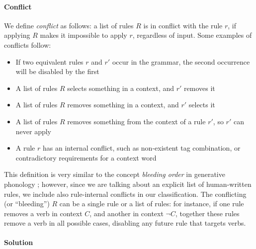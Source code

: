 \paragraph{Conflict}

We define \emph{conflict} as follows: a list of rules $R$ is in conflict with the rule $r$, if applying $R$ makes it impossible to apply $r$, regardless of input. 
Some examples of conflicts follow:

\begin{itemize}
\item If two equivalent rules $r$ and $r'$ occur in the grammar, the second occurrence will be disabled by the first
\item A list of rules $R$ selects something in a context, and $r'$ removes it
\item A list of rules $R$ removes something in a context, and $r'$ selects it
\item A list of rules $R$ removes something from the context of a rule $r'$, so $r'$ can never apply
\item A rule $r$ has an internal conflict, such as non-existent
tag combination, or contradictory requirements for a context word
\end{itemize}

This definition is very similar to the concept \emph{bleeding order} in generative phonology \cite{kiparsky1968}; however, since we are talking about an explicit list of 
human-written rules, we include also rule-internal conflicts in our classification.
The conflicting (or ``bleeding'') $R$ can be a single rule or a list of rules: for instance, if one rule removes a verb in
context $C$, and another in context $\neg C$, together these rules
remove a verb in all possible cases, disabling any future rule that
targets verbs.


\paragraph{Solution}

